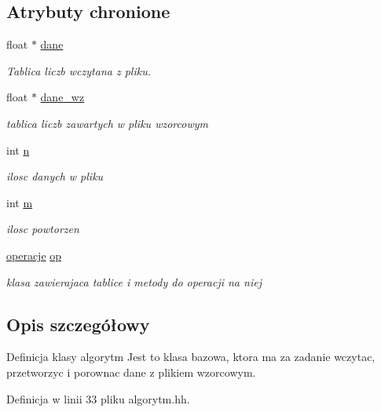 \subsection*{\-Atrybuty chronione}
\begin{DoxyCompactItemize}
\item 
float $\ast$ \hyperlink{classalgorytm_a5dd6d510b611002cfb9737f12eeff63f}{dane}
\begin{DoxyCompactList}\small\item\em \-Tablica liczb wczytana z pliku. \end{DoxyCompactList}\item 
float $\ast$ \hyperlink{classalgorytm_a93fb0f7a64eb1e4f8492445395f98e5f}{dane\-\_\-wz}
\begin{DoxyCompactList}\small\item\em tablica liczb zawartych w pliku wzorcowym \end{DoxyCompactList}\item 
int \hyperlink{classalgorytm_a2778c37f0ec06a30b7d494501c40e91a}{n}
\begin{DoxyCompactList}\small\item\em ilosc danych w pliku \end{DoxyCompactList}\item 
int \hyperlink{classalgorytm_ac9429e88b0630a008df4d011458ee5a2}{m}
\begin{DoxyCompactList}\small\item\em ilosc powtorzen \end{DoxyCompactList}\item 
\hyperlink{classoperacje}{operacje} \hyperlink{classalgorytm_aedaee1aa41206b5f050fe660d0846f2d}{op}
\begin{DoxyCompactList}\small\item\em klasa zawierajaca tablice i metody do operacji na niej \end{DoxyCompactList}\end{DoxyCompactItemize}


\subsection{\-Opis szczegółowy}
\-Definicja klasy algorytm \-Jest to klasa bazowa, ktora ma za zadanie wczytac, przetworzyc i porownac dane z plikiem wzorcowym. 

\-Definicja w linii 33 pliku algorytm.\-hh.



